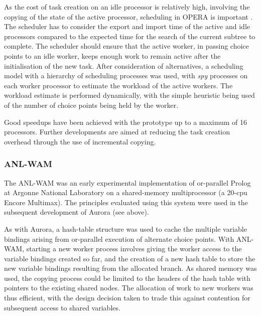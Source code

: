 As the cost of task creation on an idle processor is relatively high, involving the copying
of the state of the active processor,  scheduling in OPERA is important \cite{B+92}.
The scheduler has to consider the export and import time of the active and idle processors compared
to the expected time for the search of the current subtree to complete.  The scheduler should
ensure that the active worker, in passing choice points to an idle worker, keeps enough work
to remain active after the initialisation of the new task.  After consideration of alternatives,
a scheduling model with a hierarchy of scheduling processes was used, with \textit{spy} processes
on each worker processor to estimate the workload of the active workers.  The workload 
estimate is performed dynamically, with the simple heuristic being used of the number of
choice points being held by the worker.

Good speedups have been achieved with the prototype up to a maximum of 16 processors.
Further developments are aimed at reducing the task creation overhead through the use of
incremental copying.


\subsubsection{ANL-WAM}


The ANL-WAM was an early experimental implementation of or-parallel Prolog 
at Argonne National Laboratory on a
shared-memory multiprocessor (a 20-cpu Encore Multimax).
The principles evaluated using this system \cite{DLO87} were used in the subsequent development
of Aurora (see above).

As with Aurora, a hash-table structure was used to cache the multiple variable bindings
arising from or-parallel execution of alternate choice points.  With ANL-WAM,
starting a new worker process involves giving the worker access to the variable bindings
created so far, and the creation of a new hash table to store the new variable bindings
resulting from the allocated branch.  As shared memory was used, the copying process could
be limited to the headers of the hash table with pointers to the existing shared nodes.
The allocation of work to new workers was thus efficient, with the design decision taken to
trade this against contention for subsequent access to shared variables.

